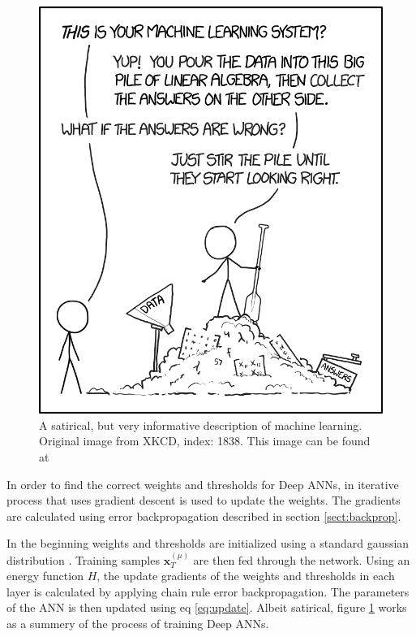 \begin{figure}
    \centering
    \includegraphics[scale=0.3]{figure/machine_learning_2x.png}
    \caption{A satirical, but very informative description of machine learning. Original image from XKCD, index: 1838. This image can be found at \cite{xkcd1838}}
    \label{fig:xkcd1838}
\end{figure}

In order to find the correct weights and thresholds for Deep ANNs, in iterative process that uses gradient descent is used to update the weights. The gradients are calculated using error backpropagation described in section \ref{sect:backprop}.

In the beginning weights and thresholds are initialized using a standard gaussian distribution \cite{mehligcourseslides}. Training samples $\bm{x}^{(\mu)}_T$ are then fed through the network. Using an energy function $H$, the update gradients of the weights and thresholds in each layer is calculated by applying chain rule error backpropagation. The parameters of the ANN is then updated using eq \eqref{eq:update}. Albeit satirical, figure \ref{fig:xkcd1838} works as a summery of the process of training Deep ANNs.

